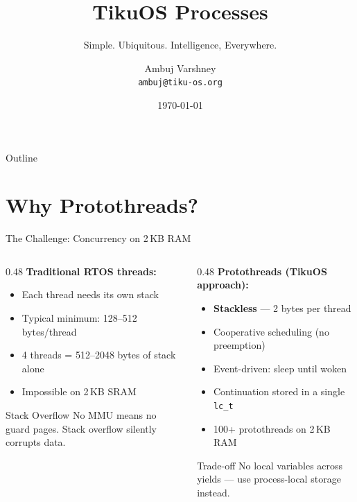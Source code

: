 \documentclass[aspectratio=169, 10pt]{beamer}
\title[TikuOS Processes]{TikuOS Processes}
\subtitle{Simple. Ubiquitous. Intelligence, Everywhere.}
\author[Ambuj Varshney]{Ambuj Varshney \\ \texttt{ambuj@tiku-os.org}}
\date{\today}
\begin{document}
\begin{frame}
\titlepage
\end{frame}

\begin{frame}{Outline}
\tableofcontents
\end{frame}

\section{Why Protothreads?}

\begin{frame}{The Challenge: Concurrency on 2\,KB RAM}
\begin{columns}[T]
\begin{column}{0.48\textwidth}
\textbf{Traditional RTOS threads:}
\begin{itemize}
  \item Each thread needs its own stack
  \item Typical minimum: 128--512 bytes/thread
  \item 4 threads = 512--2048 bytes of stack alone
  \item Impossible on 2\,KB SRAM
\end{itemize}

\vspace{0.5em}
\begin{alertblock}{Stack Overflow}
No MMU means no guard pages.
Stack overflow silently corrupts data.
\end{alertblock}
\end{column}

\begin{column}{0.48\textwidth}
\textbf{Protothreads (TikuOS approach):}
\begin{itemize}
  \item \textbf{Stackless} --- 2 bytes per thread
  \item Cooperative scheduling (no preemption)
  \item Event-driven: sleep until woken
  \item Continuation stored in a single \texttt{lc\_t}
  \item 100+ protothreads on 2\,KB RAM
\end{itemize}

\vspace{0.5em}
\begin{block}{Trade-off}
No local variables across yields ---
use process-local storage instead.
\end{block}
\end{column}
\end{columns}
\end{frame}
\end{document}
